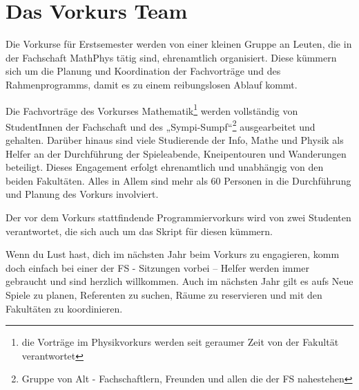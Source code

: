 \section{Das Vorkurs Team}
Die Vorkurse für Erstsemester werden von einer kleinen Gruppe an Leuten, die in der Fachschaft MathPhys tätig sind, ehrenamtlich organisiert. Diese kümmern sich um die Planung und Koordination der Fachvorträge und des Rahmenprogramms, damit es zu einem reibungslosen Ablauf kommt.

Die Fachvorträge des Vorkurses Mathematik\footnote{die Vorträge im Physikvorkurs werden seit geraumer Zeit von der Fakultät verantwortet} werden vollständig von StudentInnen der Fachschaft und des „Sympi-Sumpf“\footnote{Gruppe von Alt - Fachschaftlern, Freunden und allen die der FS nahestehen} ausgearbeitet und gehalten. Darüber hinaus sind viele Studierende der Info, Mathe und Physik als Helfer an der Durchführung der Spieleabende, Kneipentouren und Wanderungen beteiligt. Dieses Engagement erfolgt ehrenamtlich und unabhängig von den beiden Fakultäten. Alles in Allem sind mehr als 60 Personen in die Durchführung und Planung des Vorkurs involviert.

Der vor dem Vorkurs stattfindende Programmiervorkurs wird von zwei Studenten verantwortet, die sich auch um das Skript für diesen kümmern.

Wenn du Lust hast, dich im nächsten Jahr beim Vorkurs zu engagieren, komm doch einfach bei einer der FS - Sitzungen vorbei -- Helfer werden immer gebraucht und sind herzlich willkommen. Auch im nächsten Jahr gilt es aufs Neue Spiele zu planen, Referenten zu suchen, Räume zu reservieren und mit den Fakultäten zu koordinieren.
